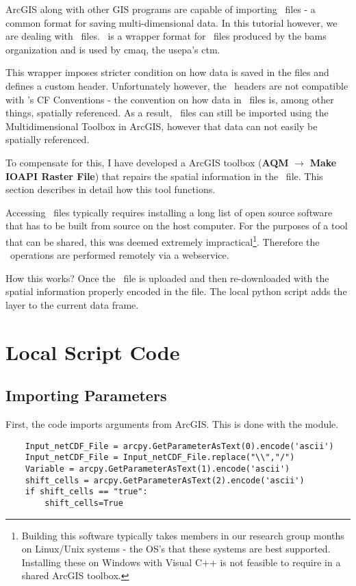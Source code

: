 ArcGIS along with other GIS programs are capable of importing \netcdf~files - a
common format for saving multi-dimensional data.  In this tutorial however, we
are dealing with \ioapi~files.  \ioapi~is a wrapper format for \netcdf~files
produced by the \ac{bams} organization and is used by \ac{cmaq}, the
\ac{usepa}'s \acf{ctm}.

This wrapper imposes stricter condition on how data is saved in the files and
defines a custom header.  Unfortunately however, the \ioapi~headers are not compatible
with \netcdf's CF Conventions - the convention on how data in
\netcdf~files is, among other things, spatially referenced.  As a
result, \ioapi~files can still be imported using the Multidimensional
Toolbox in ArcGIS, however that data can not easily be spatially
referenced.

To compensate for this, I have developed a ArcGIS toolbox
(\textbf{AQM} $\rightarrow$ \textbf{Make IOAPI Raster File}) that
repairs the spatial information in the \ioapi~file.  This section
describes in detail how this tool functions.

Accessing \ioapi~files typically requires installing a long list of open source
software that has to be built from source on the host computer.  For the
purposes of a tool that can be shared, this was deemed extremely
impractical\footnote{Building this software typically takes members in our
research group months on Linux/Unix systems - the OS's that these systems are
best supported.  Installing these on Windows with Visual C++ is not feasible to
require in a shared ArcGIS toolbox.}.  Therefore the \ioapi~operations are
performed remotely via a webservice.

How this works? Once the \ioapi~file is uploaded and then
re-downloaded with the spatial information properly encoded in the
file.  The local python script adds the layer to the current data
frame.

\section{Local Script Code}

\subsection{Importing Parameters}
First, the code imports arguments from ArcGIS.  This is done with the  module.
\singlespace
\begin{verbatim}
	Input_netCDF_File = arcpy.GetParameterAsText(0).encode('ascii')
	Input_netCDF_File = Input_netCDF_File.replace("\\","/")
	Variable = arcpy.GetParameterAsText(1).encode('ascii')
	shift_cells = arcpy.GetParameterAsText(2).encode('ascii')
	if shift_cells == "true":
		shift_cells=True
\end{verbatim}
\doublespace

